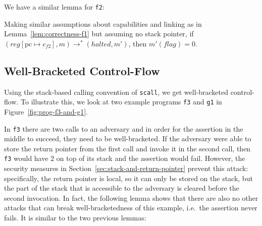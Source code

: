 \documentclass[format=acmsmall, review=true, screen=true]{acmart}
\renewcommand{\figurename}{Figure}
\renewcommand{\sectionname}{Section}
\newcommand{\update}[2]{[#1 \mapsto #2]}
\newcommand{\var}[1]{\mathit{#1}}
\newcommand{\pcreg}{\mathrm{pc}}
\newcommand{\reg}{\var{reg}}
\newcommand{\flag}{\var{flag}}
\newcommand{\halted}{\mathit{halted}}
\newcommand{\step}[1][]{\rightarrow_{#1}}
\begin{document}
We have a similar lemma for \texttt{f2}:
\begin{lemma}
  \label{lem:correctness-f2}
  Making similar assumptions about capabilities and linking as in
  Lemma~\ref{lem:correctness-f1} but assuming no stack pointer,
  if $(\reg\update{\pcreg}{c_{f2}},m) \step^* (\halted,m')$, then $m'(\flag) = 0$.
\end{lemma}

\subsection{Well-Bracketed Control-Flow} 
Using the stack-based calling convention of \texttt{scall}, we get
well-bracketed control-flow. To illustrate this, we look at
two example programs \texttt{f3} and
\texttt{g1} in \figurename~\ref{fig:prog-f3-and-g1}.

In \texttt{f3} there are two calls to an adversary and in order
for the assertion in the middle to succeed, they need to be well-bracketed. If
the adversary were able to store the return pointer from the first call and
invoke it in the second call, then \texttt{f3} would have $2$ on
top of its stack and the assertion would fail. However, the security measures in
\sectionname~\ref{sec:stack-and-return-pointer} prevent this attack: specifically,
the return pointer is local, so it can only be stored on the stack, but the part
of the stack that is accessible to the adversary is cleared before the second
invocation. In fact, the following lemma shows that there are also no other
attacks that can break well-bracketedness of this example, i.e.\ the assertion
never fails. It is similar to the two previous lemmas:
\end{document}

